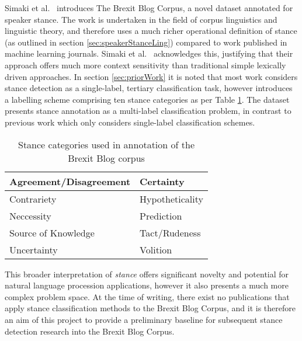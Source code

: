 \documentclass[Dissertation.tex]{subfiles}
\begin{document}
Simaki et al.\ \cite{simakiAnnotatingSpeakerStance2017} introduces The Brexit Blog Corpus, a novel dataset annotated for speaker stance. The work is undertaken in the field of corpus linguistics and linguistic theory, and therefore uses a much richer operational definition of stance (as outlined in section \ref{sec:speakerStanceLing}) compared to work published in machine learning journals. Simaki et al.\ \cite{simakiAnnotatingSpeakerStance2017} acknowledges this, justifying that their approach offers much more context sensitivity than traditional simple lexically driven approaches. In section \ref{sec:priorWork} it is noted that most work considers stance detection as a single-label, tertiary classification task, however \cite{simakiAnnotatingSpeakerStance2017} introduces a labelling scheme comprising ten stance categories as per Table \ref{tab:stanceCats}. The dataset presents stance annotation as a multi-label classification problem, in contrast to previous work which only considers single-label classification schemes. 

{\renewcommand{\arraystretch}{1.5}
	
	\begin{table}[h]
			\caption{Stance categories used in annotation of the Brexit Blog corpus \cite{simakiAnnotatingSpeakerStance2017}}
		\label{tab:stanceCats}
		\small\scshape 
		\centering
		\begin{tabular}{|l|l|}
			\hline
			Agreement/Disagreement & Certainty       \\ \hline
			Contrariety            & Hypotheticality \\ \hline
			Neccessity             & Prediction      \\ \hline
			Source of Knowledge    & Tact/Rudeness   \\ \hline
			Uncertainty            & Volition        \\ \hline
		\end{tabular}

\end{table}}

This broader interpretation of \textit{stance} offers significant novelty and potential for natural language procession applications, however it also presents a much more complex problem space. At the time of writing, there exist no publications that apply stance classification methods to the Brexit Blog Corpus, and it is therefore an aim of this project to provide a preliminary baseline for subsequent stance detection research into the Brexit Blog Corpus.
\end{document}
